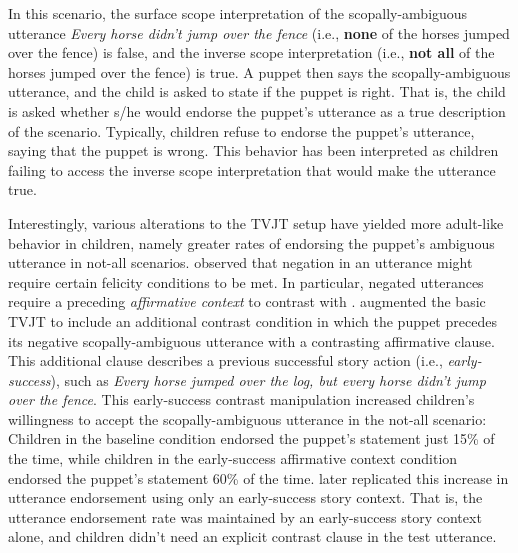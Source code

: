 \documentclass[10pt,a4paper]{article}
\begin{document}
In this scenario, the surface scope interpretation of the scopally-ambiguous utterance \textit{Every horse didn't jump over the fence} (i.e., \textbf{none} of the horses jumped over the fence) is false,  and the inverse scope interpretation (i.e., \textbf{not all} of the horses jumped over the fence) is true.  A puppet then says the scopally-ambiguous utterance, and the child is asked to state if the puppet is right. %
That is, the child is asked  whether s/he would endorse the puppet's utterance as a true description of the scenario.
Typically, children  refuse to endorse the puppet's utterance, saying that the puppet is wrong.
 This behavior has been interpreted as children failing to access the inverse scope interpretation that would make the utterance true.

Interestingly, various alterations to the TVJT setup have yielded more adult-like behavior in children, namely greater rates of endorsing the puppet's ambiguous utterance in {not-all} scenarios.
 observed that negation in an utterance might require certain felicity conditions to be met. In particular, negated utterances require a preceding \textit{affirmative context} to contrast with \cite{wason1965contexts}.  
\citeauthor{MuLid2006} augmented the basic TVJT to include an additional contrast condition in which the puppet precedes its negative scopally-ambiguous utterance with a contrasting affirmative clause. This additional clause describes a previous successful story action (i.e., \textit{early-success}),  such as  \textit{Every horse jumped over the log, but every horse didn't jump over the fence}. 
This early-success contrast manipulation increased children's willingness to accept the scopally-ambiguous utterance in the {not-all} scenario: Children in the baseline condition endorsed the puppet's statement just 15\% of the time, while children in the
early-success affirmative context
condition endorsed the puppet's statement 60\% of the time. 
 later replicated this 
increase in utterance endorsement using only an early-success story context. 
That is, the utterance endorsement rate was maintained by an early-success story context alone, and children didn't need an explicit contrast clause in the test utterance.
\end{document}
